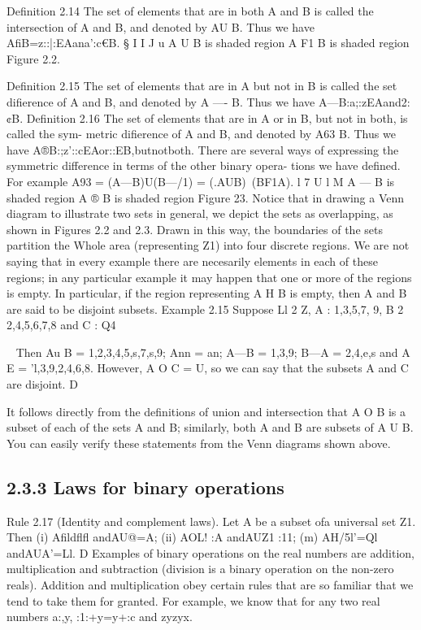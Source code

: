 {{Deﬁnition 2.14 The set of elements that are in both A and B is called the intersection of A
and B, and denoted by AU B. Thus we have
AﬁB={z::|:EAana':c€B}.
§
I  I J u
A U B is shaded region A F1 B is shaded region
Figure 2.2.


Deﬁnition 2.15 The set of elements that are in A but not in B is called the set diﬁerence of
A and B, and denoted by A —- B. Thus we have
A—B:{a;:zEAand2:¢B}.
Deﬁnition 2.16 The set of elements that are in A or in B, but not in both, is called the sym-
metric diﬁerence of A and B, and denoted by A63 B. Thus we have
A®B:{;z'::cEAor::EB,butnotboth}.
There are several ways of expressing the symmetric difference in terms of the other binary opera-
tions we have deﬁned. For example
A93 = (A—B)U(B—/1)
= (.AUB)~(BF1A).
l 7 U l   M
A — B is shaded region A ® B is shaded region
Figure 23.
Notice that in drawing a Venn diagram to illustrate two sets in general, we depict the sets as
overlapping, as shown in Figures 2.2 and 2.3. Drawn in this way, the boundaries of the sets
partition the Whole area (representing Z1) into four discrete regions. We are not saying that in
every example there are necesarily elements in each of these regions; in any particular example
it may happen that one or more of the regions is empty. In particular, if the region representing
A H B is empty, then A and B are said to be disjoint subsets.
Example 2.15 Suppose Ll 2 Z, A : {1,3,5,7, 9}, B 2 {2,4,5,6,7,8} and C : {Q}4}~ Then
Au B = {1,2,3,4,5,s,7,s,9}; Ann = {an}; A—B = {1,3,9}; B—A = {2,4,e,s} and
A  E = {'l,3,9,2,4,6,8}. However, A O C = U, so we can say that the subsets A and C are
disjoint. D

It follows directly from the deﬁnitions of union and intersection that A O B is a subset of each
of the sets A and B; similarly, both A and B are subsets of A U B. You can easily verify these
statements from the Venn diagrams shown above.

\subsection{2.3.3 Laws for binary operations}
Rule 2.17 (Identity and complement laws). Let A be a subset ofa universal set Z1. Then
(i) Aﬁldflﬂ andAU@=A;
(ii) AOL! :A andAUZ1 :11;
(m) AH/5l'=Ql andAUA’=Ll. D
Examples of binary operations on the real numbers are addition, multiplication and subtraction
(division is a binary operation on the non-zero reals). Addition and multiplication obey certain
rules that are so familiar that we tend to take them for granted. For example, we know that for
any two real numbers a:,y,
:1:+y=y+:c and zyzyx.


}
